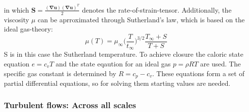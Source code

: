 \documentclass[a4paper,12pt]{article}
\renewcommand*\vec[1]{\boldsymbol{#1}}
\renewcommand*\matrix[1]{\boldsymbol{#1}}
\numberwithin{equation}{section} %
\begin{document}
in which $ \matrix{S} = \frac{(\vec\nabla \vec{u})(\vec\nabla \vec{u})^T}{2} $ denotes the rate-of-strain-tensor. Additionally, the viscosity
$ \mu $ can be aprroximated through Sutherland's law, which is based on the ideal gas-theory: 
\begin{equation}
 \mu (T) = \mu_\infty \biggl(\frac{T}{t_\infty}\biggl)^{3/2} \frac{T_\infty + S}{T + S}
\end{equation}
S is in this case the Sutherland temperature.
To achieve closure the caloric state equation $ e = c_v T $ and the state eqaution for an ideal gas $
p = \rho R T $ are used. The specific gas constant is determined by $ R = c_p - c_v $. 
These equations form a set of partial differential equations, so for solving them starting values are needed.
\pagebreak
\subsubsection{Turbulent flows: Across all scales}
\pagebreak
\end{document}
